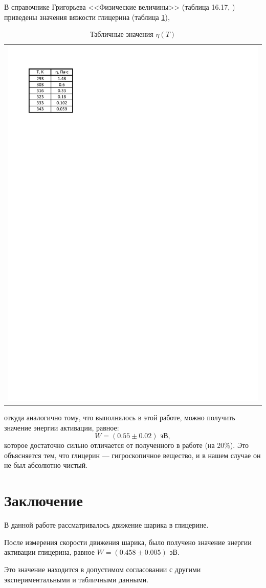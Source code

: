 \documentclass[a4paper,12pt]{article}
\begin{document}
В справочнике Григорьева <<Физические величины>> (таблица 16.17, \cite{Grigoriev:Fiz_Velichini}) приведены значения вязкости глицерина (таблица \ref{Tab:tab_dann}),
\begin{table} %
	\centering
	\begin{tabular}{c}
		\includegraphics[height=0.2\textheight]{tabl_dann}\\
	\end{tabular}
	\caption{Табличные значения $\eta(T)$}
	\label{Tab:tab_dann}
\end{table}
откуда аналогично тому, что выполнялось в этой работе, можно получить значение энергии активации, равное:
$$
W = (0.55\pm 0.02) \text{ эВ},
$$
которое достаточно сильно отличается от полученного в работе (на 20\%). Это объясняется тем, что глицерин --- гигроскопичное вещество, и в нашем случае он не был абсолютно чистый. 



\section{Заключение}
В данной работе рассматривалось движение шарика в глицерине. 

После измерения скорости движения шарика, было получено значение энергии активации глицерина, равное $W = (0.458\pm0.005) \text{ эВ}$.

Это значение находится в допустимом согласовании с другими экспериментальными и табличными данными. 





\end{document}
